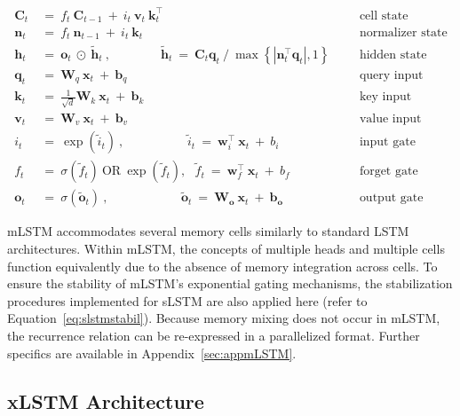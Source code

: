 \begin{align}
\label{eq:mlstm_recurrent_begin}
\mathbf{C}_t \ &= \  f_t \ \mathbf{C}_{t-1} \ + \ 
  i_t \ \mathbf{v}_t \ \mathbf{k}_t^\top & &  &\text{cell state} \\
\mathbf{n}_t \ &= \  f_t \ \mathbf{n}_{t-1} \ + \ 
  i_t \ \mathbf{k}_t & &  &\text{normalizer state} \\
\mathbf{h}_t  \ &= \ \mathbf{o}_t \ \odot \ \tilde{\mathbf{h}}_t
\ , \qquad \qquad 
\tilde{\mathbf{h}}_t \ = \   \mathbf{C}_t \mathbf{q}_t \ / \ 
  \max \left\{ |\mathbf{n}_t^\top \mathbf{q}_t|, 1 \right\} 
   &&&\text{hidden state} \\
\mathbf{q}_t \ &= \ \mathbf{W}_q \ \mathbf{x}_t \ + \ \mathbf{b}_q  & &  &\text{query input} \\
\mathbf{k}_t \ &= \ \frac{1}{\sqrt{d}} \mathbf{W}_k \ \mathbf{x}_t \ + \ \mathbf{b}_k  & &  &\text{key input} \\
\mathbf{v}_t \ &= \ \mathbf{W}_v \ \mathbf{x}_t \ + \ \mathbf{b}_v  & &  &\text{value input} \\
i_t \ &= \ \!\exp \!  \! \left( \tilde{i}_t  \right) \ , 
 \qquad \qquad \ \ \ \ \,
  \tilde{i}_t \ = \ \mathbf{w}^\top_{i} \ \mathbf{x}_t \ + \  b_{i} \ \ \ 
  &&&\text{input gate} \\
f_t \ &= \ \sigma \!  \left(  \tilde{f}_t \right) \ \text{OR} \ \!\exp \!  \! \left(  \tilde{f}_t \right) , \ \ \: \!
\tilde{f}_t \ = \ \mathbf{w}^\top_{f} \ \mathbf{x}_t  \ + \
  b_{f}
  &&& \text{forget gate} \\
\label{eq:mlstm_recurrent_end}
\mathbf{o}_t \ &= \ \sigma \left( \tilde{\mathbf{o}}_t \right) \ , \qquad \qquad \quad \ \ \ \,
  \tilde{\mathbf{o}}_t  \ = \ \mathbf{W}_{\mathbf{o}} \ \mathbf{x}_t \ + \
  \mathbf{b}_{\mathbf{o}}
  &&&\text{output gate} 
\end{align}

mLSTM accommodates several memory cells similarly to standard LSTM architectures. Within mLSTM, the concepts of multiple heads and multiple cells function equivalently due to the absence of memory integration across cells. To ensure the stability of mLSTM’s exponential gating mechanisms, the stabilization procedures implemented for sLSTM are also applied here (refer to Equation~\ref{eq:slstmstabil}).  
Because memory mixing does not occur in mLSTM, the recurrence relation can be re-expressed in a parallelized format. Further specifics are available in Appendix~\ref{sec:appmLSTM}.

\subsection{xLSTM Architecture}
\label{sec:xLSTMarch}

